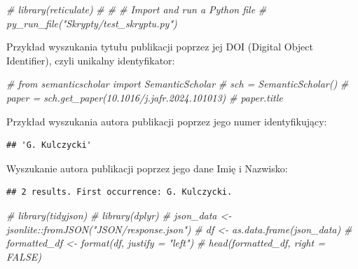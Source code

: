 \documentclass[
  12pt,
]{article}
\newenvironment{Shaded}{\begin{snugshade}}{\end{snugshade}}
\newcommand{\CommentTok}[1]{\textcolor[rgb]{0.56,0.35,0.01}{\textit{#1}}}
\begin{document}
\begin{Shaded}
\begin{Highlighting}[]
\CommentTok{\# library(reticulate)}
\CommentTok{\# }
\CommentTok{\# \# Import and run a Python file}
\CommentTok{\# py\_run\_file("Skrypty/test\_skryptu.py")}
\end{Highlighting}
\end{Shaded}

Przykład wyszukania tytułu publikacji poprzez jej DOI (Digital Object
Identifier), czyli unikalny identyfikator:

\begin{Shaded}
\begin{Highlighting}[]

\CommentTok{\# from semanticscholar import SemanticScholar}
\CommentTok{\# sch = SemanticScholar()}
\CommentTok{\# paper = sch.get\_paper(\textquotesingle{}10.1016/j.jafr.2024.101013\textquotesingle{})}
\CommentTok{\# paper.title}
\end{Highlighting}
\end{Shaded}

Przykład wyszukania autora publikacji poprzez jego numer identyfikujący:

\begin{verbatim}
## 'G. Kulczycki'
\end{verbatim}

Wyszukanie autora publikacji poprzez jego dane Imię i Nazwisko:

\begin{verbatim}
## 2 results. First occurrence: G. Kulczycki.
\end{verbatim}

\begin{Shaded}
\begin{Highlighting}[]
\CommentTok{\# library(tidyjson) }
\CommentTok{\# library(dplyr)}
\CommentTok{\# json\_data \textless{}{-} jsonlite::fromJSON("JSON/response.json") }
\CommentTok{\# df \textless{}{-} as.data.frame(json\_data) }
\CommentTok{\# formatted\_df \textless{}{-} format(df, justify = "left")}
\CommentTok{\# head(formatted\_df, right = FALSE)}
\end{Highlighting}
\end{Shaded}
\end{document}
